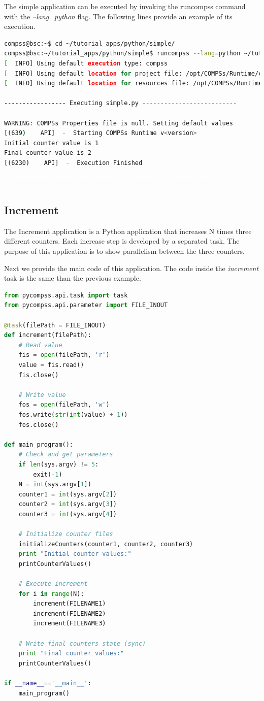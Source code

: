 The simple application can be executed by invoking the runcompss command with the \textit{--lang=python} flag. The following lines provide
an example of its execution.

\begin{lstlisting}[language=bash]
compss@bsc:~$ cd ~/tutorial_apps/python/simple/
compss@bsc:~/tutorial_apps/python/simple$ runcompss --lang=python ~/tutorial_apps/python/simple/simple.py 1
[  INFO] Using default execution type: compss
[  INFO] Using default location for project file: /opt/COMPSs/Runtime/configuration/xml/projects/default_project.xml
[  INFO] Using default location for resources file: /opt/COMPSs/Runtime/configuration/xml/resources/default_resources.xml

----------------- Executing simple.py --------------------------

WARNING: COMPSs Properties file is null. Setting default values
[(639)    API]  -  Starting COMPSs Runtime v<version>
Initial counter value is 1
Final counter value is 2
[(6230)    API]  -  Execution Finished

------------------------------------------------------------
\end{lstlisting}

\subsection{Increment}
The Increment application is a Python application that increases N times three different counters. Each increase step is developed by a separated task. The
purpose of this application is to show parallelism between the three counters.

Next we provide the main code of this application. The code inside the \textit{increment} task is the same than the previous example. 

\begin{lstlisting}[language=python]
from pycompss.api.task import task
from pycompss.api.parameter import FILE_INOUT

@task(filePath = FILE_INOUT)
def increment(filePath):
    # Read value
    fis = open(filePath, 'r')
    value = fis.read()
    fis.close()

    # Write value
    fos = open(filePath, 'w')
    fos.write(str(int(value) + 1))
    fos.close()

def main_program():
    # Check and get parameters
    if len(sys.argv) != 5:
        exit(-1)
    N = int(sys.argv[1])
    counter1 = int(sys.argv[2])
    counter2 = int(sys.argv[3])
    counter3 = int(sys.argv[4])

    # Initialize counter files
    initializeCounters(counter1, counter2, counter3)
    print "Initial counter values:"
    printCounterValues()

    # Execute increment
    for i in range(N):
        increment(FILENAME1)
        increment(FILENAME2)
        increment(FILENAME3)

    # Write final counters state (sync)
    print "Final counter values:"
    printCounterValues()

if __name__=='__main__':
    main_program()
\end{lstlisting}

